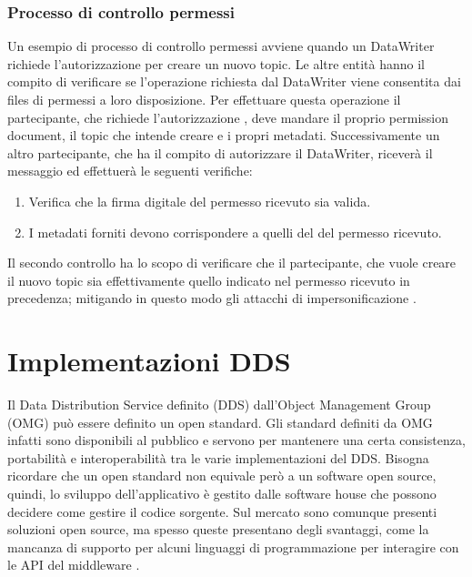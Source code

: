 \subsubsection{Processo di controllo permessi}
Un esempio di processo di controllo permessi avviene
quando un DataWriter richiede l'autorizzazione per creare un nuovo topic.
Le altre entità hanno il compito di verificare se l'operazione 
richiesta dal DataWriter viene consentita
dai files di permessi a loro disposizione. Per effettuare 
questa operazione il partecipante, che richiede l'autorizzazione ,
deve mandare il proprio permission document, il topic che intende creare e 
i propri metadati. Successivamente un altro partecipante,
che ha il compito di autorizzare il DataWriter,
riceverà il messaggio ed effettuerà le seguenti
verifiche:
\begin{enumerate}
    \item Verifica che la firma digitale del permesso ricevuto sia valida.
    \item I metadati forniti devono corrispondere a quelli del del 
    permesso ricevuto.
\end{enumerate}
Il secondo controllo ha lo scopo di verificare
che il partecipante, che vuole creare il 
nuovo topic sia effettivamente quello indicato nel permesso 
ricevuto in precedenza; mitigando in questo modo gli attacchi di 
impersonificazione 
\cite{DBLP:conf/asiaccs/WangLG24}.

\section{Implementazioni DDS}
Il Data Distribution Service definito (DDS) dall'Object Management
Group (OMG) può essere definito un open standard. Gli standard
definiti da OMG infatti sono disponibili al pubblico e servono  
per mantenere una certa consistenza, portabilità e interoperabilità
tra le varie implementazioni del DDS. Bisogna ricordare che un open 
standard non equivale però a un software open source, quindi, lo
sviluppo dell'applicativo è gestito dalle software house che possono 
decidere come gestire il codice sorgente. Sul mercato sono comunque 
presenti
soluzioni open source, ma spesso queste presentano degli svantaggi,
come la mancanza di supporto per alcuni linguaggi di programmazione 
per interagire con le API del middleware
\cite{DDSimplementationRTI}.




